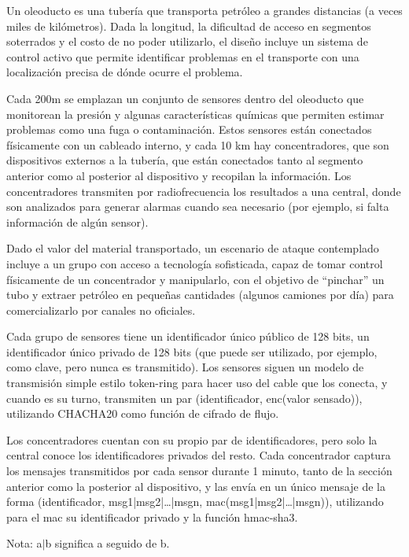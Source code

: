 \begin{consigna}
Un oleoducto es una tubería que transporta petróleo a grandes distancias (a veces miles
de kilómetros). Dada la longitud, la dificultad de acceso en segmentos soterrados y el
costo de no poder utilizarlo, el diseño incluye un sistema de control activo que
permite identificar problemas en el transporte con una localización precisa de dónde
ocurre el problema.

Cada 200m se emplazan un conjunto de sensores dentro del oleoducto que monitorean la
presión y algunas características químicas que permiten estimar problemas como una fuga
o contaminación. Estos sensores están conectados físicamente con un cableado interno, y
cada 10 km hay concentradores, que son dispositivos externos a la tubería, que están
conectados tanto al segmento anterior como al posterior al dispositivo y recopilan la
información. Los concentradores transmiten por radiofrecuencia los resultados a una
central, donde son analizados para generar alarmas cuando sea necesario (por ejemplo,
si falta información de algún sensor).

Dado el valor del material transportado, un escenario de ataque contemplado incluye a
un grupo con acceso a tecnología sofisticada, capaz de tomar control físicamente de un
concentrador y manipularlo, con el objetivo de ``pinchar'' un tubo y extraer petróleo
en pequeñas cantidades (algunos camiones por día) para comercializarlo por canales no
oficiales.

Cada grupo de sensores tiene un identificador único público de 128 bits, un
identificador único privado de 128 bits (que puede ser utilizado, por ejemplo, como
clave, pero nunca es transmitido). Los sensores siguen un modelo de transmisión simple
estilo token-ring para hacer uso del cable que los conecta, y cuando es su turno,
transmiten un par (identificador, enc(valor sensado)), utilizando CHACHA20 como función
de cifrado de flujo.

Los concentradores cuentan con su propio par de identificadores, pero solo la central
conoce los identificadores privados del resto. Cada concentrador captura los mensajes
transmitidos por cada sensor durante 1 minuto, tanto de la sección anterior como la
posterior al dispositivo, y las envía en un único mensaje de la forma (identificador,
msg1|msg2|\ldots|msgn, mac(msg1|msg2|\ldots|msgn)), utilizando para el mac su
identificador privado y la función hmac-sha3.

Nota: a$|$b significa a seguido de b.


\end{consigna}
